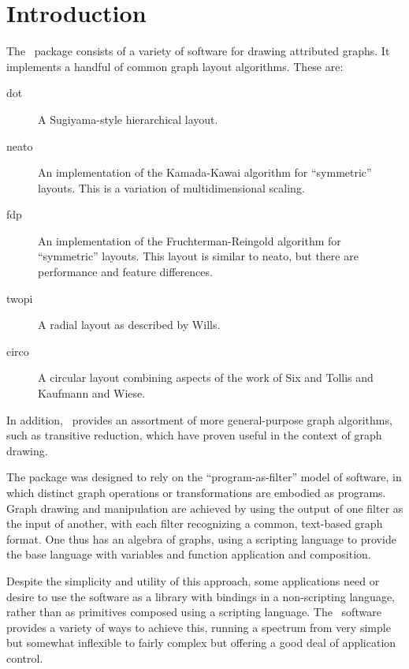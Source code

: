 \section{Introduction}
\label{sec:intro}
The \gviz\ package consists of a variety of software for drawing
attributed graphs. It implements a handful of common graph layout
algorithms. These are: 
\begin{description}
 \item[dot] A Sugiyama-style hierarchical layout\cite{stt,gknv:methods}.
 \item[neato] An implementation of the Kamada-Kawai algorithm\cite{kk}
for ``symmetric'' layouts. This is a
variation of multidimensional scaling\cite{kruskal,cohen}.
 \item[fdp] An implementation of the Fruchterman-Reingold 
algorithm\cite{fr}
for ``symmetric'' layouts. This layout is similar to neato, but there
are performance and feature differences. 
 \item[twopi] A radial layout as described by Wills\cite{nicheworks}.
 \item[circo] A circular layout combining aspects of the
work of Six and Tollis\cite{st,st2} and Kaufmann and Wiese\cite{kw}.
\end{description}
In addition, \gviz\ provides an assortment of more general-purpose
graph algorithms, such as transitive reduction, which have proven useful in
the context of graph drawing.

The package was designed\cite{gviz}
 to rely on the
``program-as-filter'' model of software, in which distinct graph
operations or transformations are embodied as programs. Graph drawing
and manipulation are achieved by using the output of one filter as
the input of another, with each filter recognizing a common, text-based
graph format.
One thus has an algebra of graphs, using a scripting language to provide
the base language with variables and function application and composition.

Despite the simplicity and utility of this approach, some
applications need or desire to use the software as a library with
bindings in a non-scripting language, rather than as primitives composed
using a scripting language. The \gviz\ software provides a variety of 
ways to achieve
this, running a spectrum from very simple but somewhat inflexible to
fairly complex but offering a good deal of application control.

